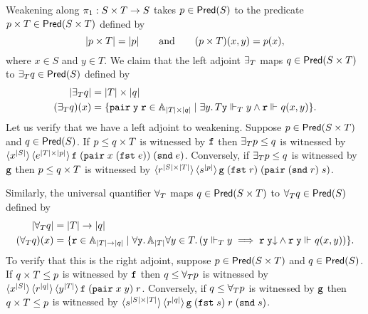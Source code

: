 Weakening along $\pi_1 : \asm{S} \times \asm{T} \to \asm{S}$ takes $p
\in \Pred{\asm{S}}$ to the predicate $p \times \asm{T} \in
\Pred{\asm{S} \times \asm{T}}$ defined by
%
\begin{equation*}
  |p \times \asm{T}| = |p|
  \qquad\text{and}\qquad
  (p \times \asm{T})(x,y) = p(x),
\end{equation*}
%
where $x \in S$ and $y \in T$. We claim that the left adjoint
$\exists_{\asm{T}}$ maps $q \in \Pred{\asm{S} \times \asm{T}}$ to
$\exists_{\asm{T}} q \in \Pred{\asm{S}}$ defined by
%
\begin{align*}
  |\exists_{\asm{T}} q| &= |T| \times |q| \\
  (\exists_{\asm{T}} q)(x) &=
  \set{ \combPair\;\R{y}\;\R{r} \in \Atyp{|T| \times |q|} \such
    \some{y}{T}{\R{y} \rz[T] y \land \R{r} \rz q(x,y)}
  }.
\end{align*}
%
Let us verify that we have a left adjoint to weakening. Suppose $p \in
\Pred{\asm{S} \times \asm{T}}$ and $q \in \Pred{\asm{S}}$. If $p \leq
q \times \asm{T}$ is witnessed by $\R{f}$ then $\exists_{\asm{T}} p
\leq q$ is witnessed by $\tpcalam{x}{|S|} \tpcalam{e}{|T| \times
    |p|}{\R{f}\; (\combPair \; x \; (\combFst\; e)) \; (\combSnd \; e)}$.
Conversely, if $\exists_{\asm{T}} p \leq q$ is witnessed by $\R{g}$
then $p \leq q \times \asm{T}$ is witnessed by $\tpcalam{r}{|S|
    \times |T|} \tpcalam{s}{|p|}{\R{g} \;
  (\combFst\;r)\; (\combPair \; (\combSnd \; r) \; s)}$.

Similarly, the universal quantifier $\forall_{\asm{T}}$ maps $q \in
\Pred{\asm{S} \times \asm{T}}$ to $\forall_{\asm{T}} q \in
\Pred{\asm{S}}$ defined by
%
\begin{align*}
  |\forall_{\asm{T}} q| &= |T| \to |q| \\
  (\forall_{\asm{T}} q)(x) &=
  \set{ \R{r} \in \Atyp{|T| \to |q|} \such
    \all{\R{y}}{\Atyp{|T|}}{
      \all{y \in T}
        (\R{y} \rz[T] y \implies
        \defined{\R{r}\;\R{y}} \land
        \R{r}\;\R{y} \rz q(x,y))
    }
  }.
\end{align*}
%
To verify that this is the right adjoint, suppose $p \in \Pred{\asm{S}
  \times \asm{T}}$ and $q \in \Pred{\asm{S}}$. If $q \times \asm{T}
\leq p$ is witnessed by $\R{f}$ then $q \leq \forall_{\asm{T}} p$ is
witnessed by $\tpcalam{x}{|S|} \tpcalam{r}{|q|}
  \tpcalam{y}{|T|}{\R{f} \; (\combPair \; x \; y) \; r}$. Conversely,
if $q \leq \forall_{\asm{T}} p$ is witnessed by $\R{g}$ then $q \times
\asm{T} \leq p$ is witnessed by $\tpcalam{s}{|S| \times |T|}
  \tpcalam{r}{|q|}{\R{g} \; (\combFst \; s) \; r \; (\combSnd \; s)}$.

